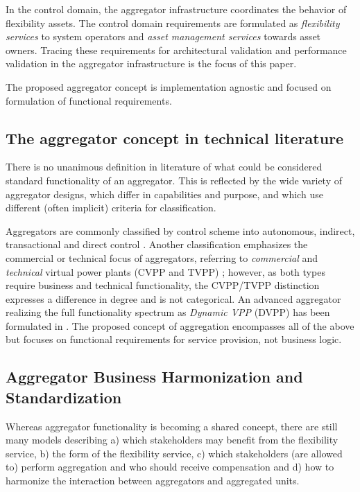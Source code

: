 In the control domain, the aggregator infrastructure coordinates the behavior of flexibility assets. The control domain requirements are formulated as \emph{flexibility services} to system operators and \emph{asset management services} towards asset owners. Tracing these requirements for architectural validation and performance validation in the aggregator infrastructure is the focus of this paper.

The proposed aggregator concept is implementation agnostic and focused on formulation of functional requirements.

\subsection{The aggregator concept in technical literature}
There is no unanimous definition in literature of what could be considered standard functionality of an aggregator. This is reflected by the wide variety of aggregator designs\cite{kok2005powermatcher,han2010development,sortomme2011optimal,costanzo2013coordination}, which differ in capabilities and purpose, and which use different (often implicit) criteria for classification.

Aggregators are commonly classified by control scheme into autonomous, indirect, transactional and direct control \cite{Kosek}. Another classification emphasizes the commercial or technical focus of aggregators, referring to \emph{commercial} and \emph{technical} virtual power plants (CVPP and TVPP) \cite{fenix2009}; however, as both types require business and technical functionality, the CVPP/TVPP distinction expresses a difference in degree and is not categorical. An advanced aggregator realizing the full functionality spectrum as \emph{Dynamic VPP} (DVPP) has been formulated in \cite{niesse2014conjoint}. 
The proposed concept of aggregation encompasses all of the above but focuses on functional requirements for service provision, not business logic.

\subsection{Aggregator Business Harmonization and Standardization}
Whereas aggregator functionality is becoming a shared concept, there are still many models describing a) which stakeholders may benefit from the flexibility service, b) the form of the flexibility service, c) which stakeholders (are allowed to) perform aggregation and who should receive compensation \cite{eurel-aggr} and d) how to harmonize the interaction between aggregators and aggregated units.

